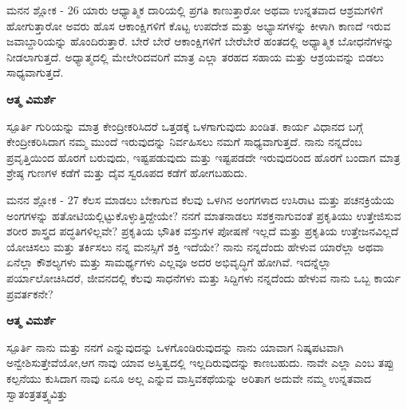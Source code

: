 \begin{mananam}{\mananamfont ಮನನ ಶ್ಲೋಕ - \textenglish{26}}
\footnotesize \mananamtext ಯಾರು ಆಧ್ಯಾತ್ಮಿಕ ದಾರಿಯಲ್ಲಿ ಪ್ರಗತಿ ಕಾಣುತ್ತಾರೋ ಅಥವಾ ಉನ್ನತವಾದ ಆಶ್ರಮಗಳಿಗೆ ಹೋಗುತ್ತಾರೋ ಅವರು ಹೊಸ ಆಕಾಂಕ್ಷಿಗಳಿಗೆ ಕೊಟ್ಟ ಉಪದೇಶ ಮತ್ತು ಅಭ್ಯಾಸಗಳನ್ನು ಕೀಳಾಗಿ ಕಾಣದೆ ಇರುವ ಜವಾಬ್ದಾರಿಯನ್ನು ಹೊಂದಿರುತ್ತಾರೆ. ಬೇರೆ ಬೇರೆ ಆಕಾಂಕ್ಷಿಗಳಿಗೆ ಬೇರೆಬೇರೆ ಹಂತದಲ್ಲಿ ಅಧ್ಯಾತ್ಮಿಕ ಬೋಧನೆಗಳನ್ನು ನೀಡಲಾಗುತ್ತದೆ. ಅಧ್ಯಾತ್ಮದಲ್ಲಿ ಮೇಲೇರಿದವರಿಗೆ ಮಾತ್ರ ಎಲ್ಲಾ ತರಹದ ಸಹಾಯ ಮತ್ತು ಆಶ್ರಯವನ್ನು ಬಿಡಲು ಸಾಧ್ಯವಾಗುತ್ತದೆ.
\end{mananam}
\WritingHand\enspace\textbf{ಆತ್ಮ ವಿಮರ್ಶೆ}\\
\begin{inspiration}{\mananamfont ಸ್ಪೂರ್ತಿ}
\footnotesize \mananamtext ಗುರಿಯನ್ನು ಮಾತ್ರ ಕೇಂದ್ರೀಕರಿಸಿದರೆ ಒತ್ತಡಕ್ಕೆ ಒಳಗಾಗುವುದು ಖಂಡಿತ. ಕಾರ್ಯ ವಿಧಾನದ ಬಗ್ಗೆ ಕೇಂದ್ರೀಕರಿಸಿದಾಗ ನಮ್ಮ ಮುಂದೆ ಇರುವುದನ್ನು ನಿರ್ವಹಿಸಲು ನಮಗೆ ಸಾಧ್ಯವಾಗುತ್ತದೆ. ನಾನು ನನ್ನದೆಂಬ ಪ್ರವೃತ್ತಿಯಿಂದ ಹೊರಗೆ ಬರುವುದು, ಇಷ್ಟಪಡುವುದು ಮತ್ತು ಇಷ್ಟಪಡದೇ ಇರುವುದರಿಂದ ಹೊರಗೆ ಬಂದಾಗ ಮಾತ್ರ ಶ್ರೇಷ್ಠ ಗುಣಗಳ ಕಡೆಗೆ ಮತ್ತು ದೈವ ಸ್ವರೂಪದ ಕಡೆಗೆ ಹೋಗಬಹುದು.
\end{inspiration}
\newpage

\begin{mananam}{\mananamfont ಮನನ ಶ್ಲೋಕ - \textenglish{27}}
\footnotesize \mananamtext ಕೆಲಸ ಮಾಡಲು ಬೇಕಾಗುವ ಕೆಲವು ಒಳಗಿನ ಅಂಗಗಳಾದ ಉಸಿರಾಟ ಮತ್ತು ಪಚನಕ್ರಿಯೆಯ ಅಂಗಗಳನ್ನು ಹತೋಟಿಯಲ್ಲಿಟ್ಟುಕೊಳ್ಳುತ್ತಿದ್ದೇಯೇ? ನನಗೆ ಮಾತನಾಡಲು ಸಶಕ್ತನಾಗುವಂತೆ ಪ್ರಕೃತಿಯು ಉತ್ತೇಜಿಸುವ ಶರೀರ ಶಾಸ್ತ್ರದ ಪದ್ಧತಿಗಳಿಲ್ಲವೇ? ಪ್ರಕೃತಿಯ ಭೌತಿಕ ವಸ್ತುಗಳ ಪೋಷಣೆ ಇಲ್ಲದೆ ಮತ್ತು ಪ್ರಕೃತಿಯ ಉತ್ತೇಜನವಿಲ್ಲದೆ ಯೋಚಿಸಲು ಮತ್ತು ತರ್ಕಿಸಲು ನನ್ನ ಮನಸ್ಸಿಗೆ ಶಕ್ತಿ ಇದೆಯೇ? ನಾನು ನನ್ನದೆಂದು ಹೇಳುವ ಯಾರೆಲ್ಲಾ ಅಥವಾ ಏನೆಲ್ಲಾ ಕೌಶಲ್ಯಗಳು ಮತ್ತು ಸಾಮರ್ಥ್ಯಗಳು ಎಲ್ಲವೂ ಅದರ ಅಭಿವೃದ್ಧಿಗೆ ಹೋಗಿವೆ. ಇದನ್ನೆಲ್ಲಾ ಪರ್ಯಾಲೋಚಿಸಿದರೆ, ಜೀವನದಲ್ಲಿ ಕೆಲವು ಸಾಧನೆಗಳು ಮತ್ತು ಸಿದ್ದಿಗಳು ನನ್ನದೆಂದು ಹೇಳುವ ನಾನು ಒಬ್ಬ ಕಾರ್ಯ ಪ್ರವರ್ತಕನೇ?
\end{mananam}
\WritingHand\enspace\textbf{ಆತ್ಮ ವಿಮರ್ಶೆ}\\
\begin{inspiration}{\mananamfont ಸ್ಪೂರ್ತಿ}
\footnotesize \mananamtext ನಾನು ಮತ್ತು ನನಗೆ ಎನ್ನುವುದನ್ನು ಒಳಗೊಂಡಿರುವುದನ್ನು ನಾನು ಯಾವಾಗ ನಿಷ್ಕಪಟವಾಗಿ ಅನ್ವೇಶಿಸುತ್ತೇವೆಯೋ,ಆಗ ನಾವು ಯಾವ ಅಸ್ತಿತ್ವದಲ್ಲಿ ಇಲ್ಲದಿರುವುದನ್ನು ಕಾಣಬಹುದು. ನಾವೇ ಎಲ್ಲಾ ಎಂಬ ತಪ್ಪು ಕಲ್ಪನೆಯು ಕುಸಿದಾಗ ನಾವು ಏನೂ ಅಲ್ಲ ಎನ್ನುವ ವಾಸ್ತಿವಕಥೆಯನ್ನು ಅರಿತಾಗ ಅದುವೇ ನಮ್ಮ ಉನ್ನತವಾದ ಸ್ವಾತಂತ್ರತತ್ತ್ವವಿತ್ತು 
\end{inspiration}
\newpage

